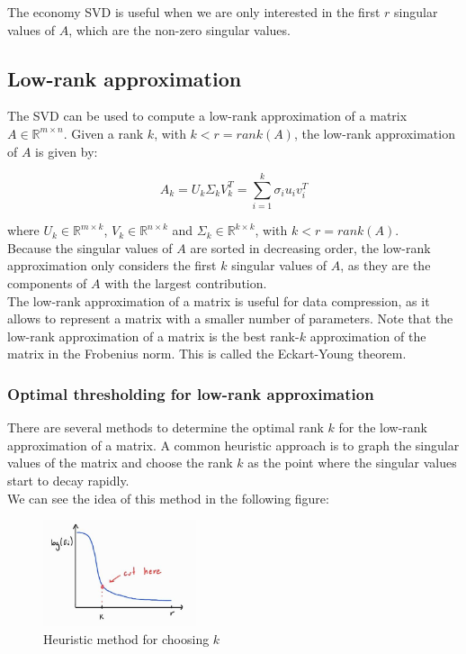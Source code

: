 The economy SVD is useful when we are only interested in the first $r$ singular values of $A$, which are the non-zero singular values.\\

\subsection{Low-rank approximation}

The SVD can be used to compute a low-rank approximation of a matrix $A \in \mathbb{R}^{m \times n}$. Given a rank $k$, with $k < r = rank(A)$,
the low-rank approximation of $A$ is given by:

\begin{equation}
    A_k = U_k \Sigma_k V_k^T = \sum_{i=1}^{k} \sigma_i u_i v_i^T
\end{equation}

where $U_k \in \mathbb{R}^{m \times k}$, $V_k \in \mathbb{R}^{n \times k}$ and $\Sigma_k \in \mathbb{R}^{k \times k}$, with $k < r = rank(A)$.\\

Because the singular values of $A$ are sorted in decreasing order, the low-rank approximation only considers the first $k$ singular values of $A$,
as they are the components of $A$ with the largest contribution.\\

The low-rank approximation of a matrix is useful for data compression, as it allows to represent a matrix with a smaller number of parameters. 
Note that the low-rank approximation of a matrix is the best rank-$k$ approximation of the matrix in the Frobenius norm. This is called 
the Eckart-Young theorem.

\subsubsection{Optimal thresholding for low-rank approximation}

There are several methods to determine the optimal rank $k$ for the low-rank approximation of a matrix. A common heuristic approach
is to graph the singular values of the matrix and choose the rank $k$ as the point where the singular values start to decay rapidly.\\

We can see the idea of this method in the following figure:\\

\begin{figure}[H]
    \centering
    \includegraphics[width=0.4\textwidth]{figures/image_opt_thresh_1.jpg}
    \caption{Heuristic method for choosing $k$}
    \label{fig:heur_k_choose}
\end{figure}

